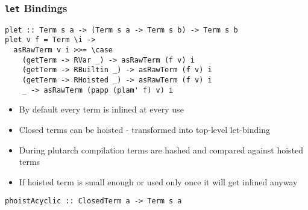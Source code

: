 \documentclass{beamer}
\begin{document}
\begin{frame}
  \frametitle{\verb|let| Bindings}
\begin{verbatim}
plet :: Term s a -> (Term s a -> Term s b) -> Term s b
plet v f = Term \i ->
  asRawTerm v i >>= \case
    (getTerm -> RVar _) -> asRawTerm (f v) i
    (getTerm -> RBuiltin _) -> asRawTerm (f v) i
    (getTerm -> RHoisted _) -> asRawTerm (f v) i
    _ -> asRawTerm (papp (plam' f) v) i
\end{verbatim}
\end{frame}

\begin{frame}
  \begin{itemize}
    \item By default every term is inlined at every use
    \item Closed terms can be hoisted - transformed into top-level let-binding
    \item During plutarch compilation terms are hashed and compared against hoisted terms
    \item If hoisted term is small enough or used only once it will get inlined anyway
    \end{itemize}
\begin{verbatim}
phoistAcyclic :: ClosedTerm a -> Term s a
\end{verbatim}
\end{frame}
\end{document}
